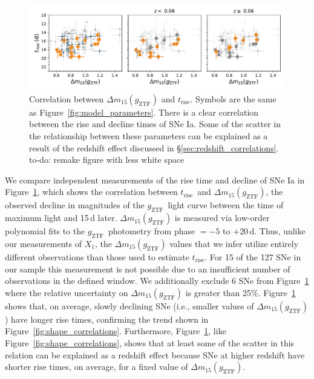 \documentclass[twocolumn]{./aastex63}
\newcommand{\todo}[1]{{\color{magenta} to-do: {#1}}}
\newcommand{\gztf}{$g_\mathrm{ZTF}$}
\newcommand{\trise}{$t_\mathrm{rise}$}
\begin{document}
\begin{figure}
    \centering
    \includegraphics[width=6in]{./figures/dm15_rise.pdf}
    \caption{Correlation between $\Delta m_{15}(g_\mathrm{ZTF})$ and \trise.
    Symbols are the same as Figure~\ref{fig:model_parameters}. There is a clear
    correlation between the rise and decline times of SNe Ia. Some of the
    scatter in the relationship between these parameters can be explained as a
    result of the redshift effect discussed in
    \S\ref{sec:redshift_correlations}. \todo{remake figure with less white
    space}}
    \label{fig:dm15}
\end{figure}

We compare independent measurements of the rise time and decline of SNe Ia in
Figure~\ref{fig:dm15}, which shows the correlation between \trise\ and $\Delta
m_{15}(g_\mathrm{ZTF})$, the observed decline in magnitudes of the \gztf\
light curve between the time of maximum light and 15\,d later. $\Delta
m_{15}(g_\mathrm{ZTF})$ is measured via low-order polynomial fits to the
\gztf\ photometry from phase $= -5$ to $+20$\,d. Thus, unlike our measurements
of $X_1$, the $\Delta m_{15}(g_\mathrm{ZTF})$ values that we infer utilize
entirely different observations than those used to estimate \trise. For 15 of
the 127 SNe in our sample this measurement is not possible due to an
insufficient number of observations in the defined window. We additionally
exclude 6 SNe from Figure~\ref{fig:dm15} where the relative uncertainty on
$\Delta m_{15}(g_\mathrm{ZTF})$ is greater than 25\%. Figure~\ref{fig:dm15}
shows that, on average, slowly declining SNe (i.e., smaller values of $\Delta
m_{15}(g_\mathrm{ZTF})$) have longer rise times, confirming the trend shown in
Figure~\ref{fig:shape_correlations}. Furthermore, Figure~\ref{fig:dm15}, like
Figure~\ref{fig:shape_correlations}, shows that at least some of the scatter
in this relation can be explained as a redshift effect because SNe at higher
redshift have shorter rise times, on average, for a fixed value of $\Delta
m_{15}(g_\mathrm{ZTF})$.
\end{document}
